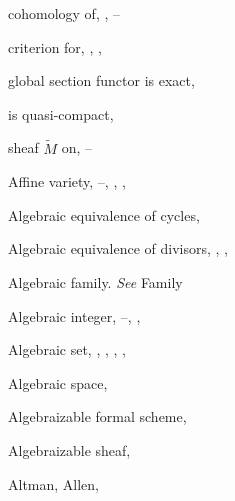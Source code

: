 {{\noindent\hspace*{7.5bp}cohomology of, , --\par
\noindent\hspace*{7.5bp}criterion for, , , \par
\noindent\hspace*{7.5bp}global section functor is exact, \par
\noindent\hspace*{7.5bp}is quasi-compact, \par
\noindent\hspace*{7.5bp}sheaf $\widetilde M$ on, --\par
\noindent\hspace*{0.0bp}Affine variety, --, , , \par
\noindent\hspace*{0.0bp}Algebraic equivalence of cycles, \par
}\hfill%
\parbox[t]{162.5bp}{\fontsize{8.05}{8.49}\selectfont%
\raggedright\setlength{\parskip}{0pt}%
\noindent\hspace*{0.0bp}Algebraic equivalence of divisors, , ,\par
\noindent\hspace*{15.0bp}\par
\noindent\hspace*{0.0bp}Algebraic family. \emph{See} Family\par
\noindent\hspace*{0.0bp}Algebraic integer, --, , \par
\noindent\hspace*{0.0bp}Algebraic set, , , , , \par
\noindent\hspace*{0.0bp}Algebraic space, \par
\noindent\hspace*{0.0bp}Algebraizable formal scheme, \par
\noindent\hspace*{0.0bp}Algebraizable sheaf, \par
\noindent\hspace*{0.0bp}Altman, Allen, \par
}}
